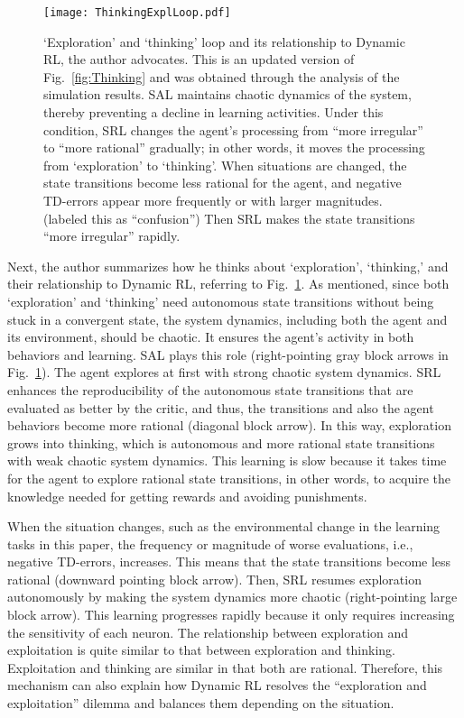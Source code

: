 \begin{figure}[t]
\centerline{\texttt{[image: ThinkingExplLoop.pdf]}}
\caption{`Exploration' and `thinking' loop and its relationship to Dynamic RL, the author advocates.
This is an updated version of Fig.~\ref{fig:Thinking} and was obtained through the analysis of the simulation results.
SAL maintains chaotic dynamics of the system,
thereby preventing a decline in learning activities.
Under this condition, SRL changes the agent's processing from ``more irregular'' to ``more rational'' gradually;
in other words, it moves the processing from `exploration' to `thinking'.
When situations are changed, the state transitions become less rational for the agent,
and negative TD-errors appear more frequently or with larger magnitudes.
(labeled this as ``confusion'')
Then SRL makes the state transitions ``more irregular'' rapidly.
}
\label{fig:ThinkingExplLoop}
\end{figure}
Next, the author summarizes how he thinks about `exploration', `thinking,' and their relationship to Dynamic RL,
referring to Fig.~\ref{fig:ThinkingExplLoop}.
As mentioned, since both `exploration' and `thinking' need autonomous state transitions
without being stuck in a convergent state,
the system dynamics, including both the agent and its environment, should be chaotic.
It ensures the agent's activity in both behaviors and learning.
SAL plays this role (right-pointing gray block arrows in Fig.~\ref{fig:ThinkingExplLoop}).
The agent explores at first with strong chaotic system dynamics.
SRL enhances the reproducibility of the autonomous state transitions that are evaluated as better by the critic,
and thus, the transitions and also the agent behaviors become more rational (diagonal block arrow).
In this way, exploration grows into thinking, which is autonomous and more rational state transitions
with weak chaotic system dynamics.
This learning is slow because it takes time for the agent to explore rational state transitions,
in other words, to acquire the knowledge needed for getting rewards and avoiding punishments.

When the situation changes, such as the environmental change in the learning tasks in this paper,
the frequency or magnitude of worse evaluations, i.e., negative TD-errors, increases.
This means that the state transitions become less rational  (downward pointing block arrow).
Then, SRL resumes exploration autonomously by making the system dynamics more chaotic
(right-pointing large block arrow).
This learning progresses rapidly because it only requires increasing the sensitivity of each neuron.
The relationship between exploration and exploitation is quite similar to that between exploration and thinking.
Exploitation and thinking are similar in that both are rational.
Therefore, this mechanism can also explain how Dynamic RL resolves the ``exploration and exploitation'' dilemma
and balances them depending on the situation.


